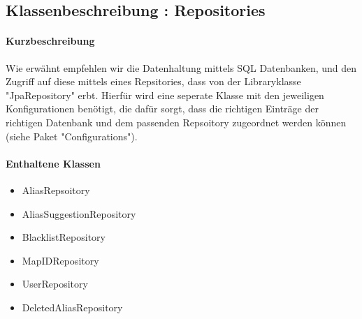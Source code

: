 \subsection{Klassenbeschreibung : Repositories}%
\paragraph*{Kurzbeschreibung}
Wie erwähnt empfehlen wir die Datenhaltung mittels SQL Datenbanken, und den Zugriff auf diese mittels eines Repsitories,
dass von der Libraryklasse "JpaRepository" erbt. Hierfür wird eine seperate Klasse mit den jeweiligen Konfigurationen benötigt,
die dafür sorgt, dass die richtigen Einträge der richtigen Datenbank und dem passenden Repsoitory zugeordnet werden können (siehe Paket "Configurations").

\paragraph*{Enthaltene Klassen}
\begin{itemize}
    \item AliasRepsoitory
    \item AliasSuggestionRepository
    \item BlacklistRepository
    \item MapIDRepository
    \item UserRepository
    \item DeletedAliasRepository
\end{itemize}